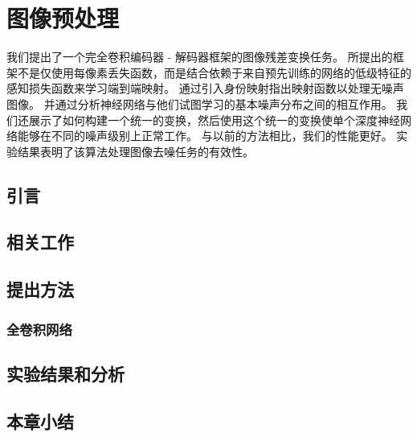 
\chapter{图像预处理}
\label{chap:denoising}

我们提出了一个完全卷积编码器 - 解码器框架的图像残差变换任务。 所提出的框架不是仅使用每像素丢失函数，而是结合依赖于来自预先训练的网络的低级特征的感知损失函数来学习端到端映射。 通过引入身份映射指出映射函数以处理无噪声图像。 并通过分析神经网络与他们试图学习的基本噪声分布之间的相互作用。 我们还展示了如何构建一个统一的变换，然后使用这个统一的变换使单个深度神经网络能够在不同的噪声级别上正常工作。 与以前的方法相比，我们的性能更好。 实验结果表明了该算法处理图像去噪任务的有效性。

\section{引言}

 
\section{相关工作}

 
\section{提出方法}
\subsection{全卷积网络}
 
\section{实验结果和分析}
\section{本章小结}


